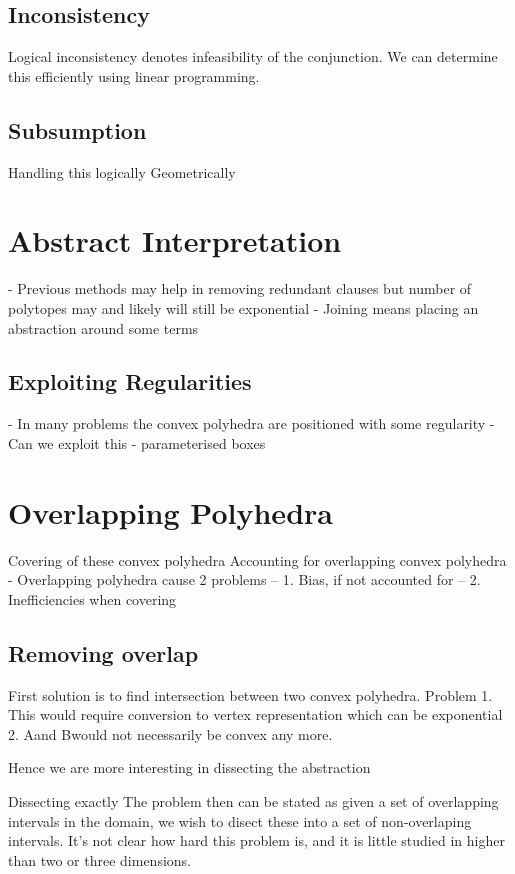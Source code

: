 \subsection{Inconsistency}
Logical inconsistency denotes infeasibility of the conjunction.
We can determine this efficiently using linear programming.

\subsection{Subsumption}
Handling this logically
Geometrically

\section{Abstract Interpretation}
- Previous methods may help in removing redundant clauses but number of polytopes may and likely will still be exponential
- Joining means placing an abstraction around some terms

\subsection{Exploiting Regularities}
- In many problems the convex polyhedra are positioned with some regularity
- Can we exploit this
- parameterised boxes

\section{Overlapping Polyhedra}
Covering of these convex polyhedra
Accounting for overlapping convex polyhedra
- Overlapping polyhedra cause 2 problems
-- 1. Bias, if not accounted for
-- 2. Inefficiencies when covering

\subsection{Removing overlap}
First solution is to find intersection between two convex polyhedra.
Problem 1. This would require conversion to vertex representation which can be exponential
2. A\B and B\A would not necessarily be convex any more.

Hence we are more interesting in dissecting the abstraction

Dissecting exactly
The problem then can be stated as given a set of overlapping intervals in the domain, we wish to disect these into a set of non-overlaping intervals.
It's not clear how hard this problem is, and it is little studied in higher than two or three dimensions.

